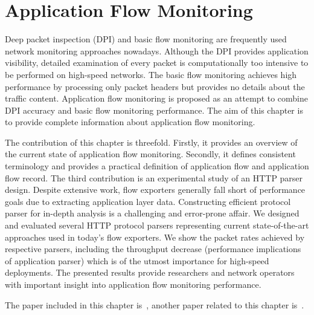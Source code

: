 \chapter{Application Flow Monitoring}\label{chap:application-flow-monitoring}

\begin{chapintro}

Deep packet inspection (DPI) and basic flow monitoring are frequently used network monitoring approaches nowadays. Although the DPI provides application visibility, detailed examination of every packet is computationally too intensive to be performed on high-speed networks. The basic flow monitoring achieves high performance by processing only packet headers but provides no details about the traffic content. Application flow monitoring is proposed as an attempt to combine DPI accuracy and basic flow monitoring performance. The aim of this chapter is to provide complete information about application flow monitoring. 

The contribution of this chapter is threefold. Firstly, it provides an overview of the current state of application flow monitoring. Secondly, it defines consistent terminology and provides a practical definition of application flow and application flow record. The third contribution is an experimental study of an HTTP parser design. Despite extensive work, flow exporters generally fall short of performance goals due to extracting application layer data. Constructing efficient protocol parser for in-depth analysis is a challenging and error-prone affair. We designed and evaluated several HTTP protocol parsers representing current state-of-the-art approaches used in today's flow exporters. We show the packet rates achieved by respective parsers, including the throughput decrease (performance implications of application parser) which is of the utmost importance for high-speed deployments. The presented results provide researchers and network operators with important insight into application flow monitoring performance.

The paper included in this chapter is~\cite{Velan-2013-Design}, another paper related to this chapter is~\cite{Velan-2014-Next}.


\end{chapintro}
